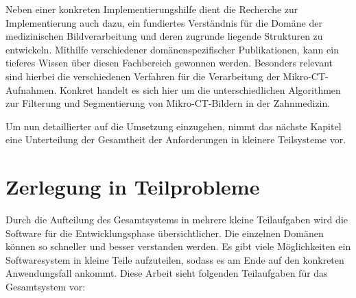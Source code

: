 Neben einer konkreten Implementierungshilfe dient die Recherche zur
Implementierung auch dazu, ein fundiertes Verständnis für die Domäne der medizinischen
Bildverarbeitung und deren zugrunde liegende Strukturen zu entwickeln. Mithilfe
verschiedener domänenspezifischer Publikationen, kann ein tieferes Wissen über diesen
Fachbereich gewonnen werden. Besonders relevant sind hierbei die verschiedenen
Verfahren für die Verarbeitung der Mikro-\ac{CT}-Aufnahmen. Konkret handelt es
sich hier um die unterschiedlichen Algorithmen zur Filterung und Segmentierung
von Mikro-\ac{CT}-Bildern in der Zahnmedizin.

Um nun detaillierter auf die Umsetzung einzugehen, nimmt das nächste Kapitel
eine Unterteilung der Gesamtheit der Anforderungen in kleinere Teilsysteme vor.

\section{Zerlegung in Teilprobleme}
\label{sec_zerlegung_in_teilprobleme} Durch die Aufteilung des Gesamtsystems in
mehrere kleine Teilaufgaben wird die Software für die Entwicklungsphase
übersichtlicher. Die einzelnen Domänen können so schneller und besser verstanden
werden. Es gibt viele Möglichkeiten ein Softwaresystem in kleine Teile
aufzuteilen, sodass es am Ende auf den konkreten Anwendungsfall ankommt. Diese
Arbeit sieht folgenden Teilaufgaben für das Gesamtsystem vor:

